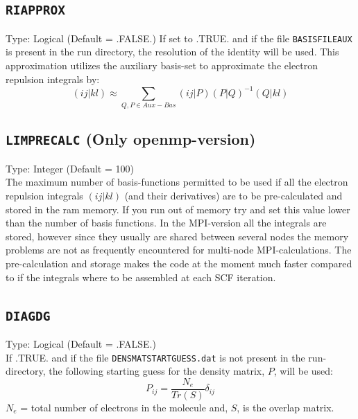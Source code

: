 \documentclass[a4paper,twoside,openany]{book}
\begin{document}
\subsection{\texttt{RIAPPROX}}
Type: Logical (Default = .FALSE.)
If set to .TRUE. and if the file \texttt{BASISFILEAUX} is present in the run directory, the resolution of the identity \cite{RI1} will be used. This approximation utilizes the auxiliary basis-set to approximate the electron repulsion integrals by:
\begin{equation}
(ij|kl) \approx \sum_{Q,P \in Aux-Bas}(ij|P)(P|Q)^{-1}(Q|kl)
\end{equation}

\subsection{\texttt{LIMPRECALC} (Only openmp-version)}
Type: Integer (Default = 100)\\
The maximum number of basis-functions permitted to be used if all the electron repulsion integrals $(ij|kl)$ (and their derivatives) are to be pre-calculated and stored in the ram memory. If you run out of memory try and set this value lower than the number of basis functions. In the MPI-version all the 
integrals are stored, however since they usually are shared between several nodes the memory problems are not as frequently encountered for multi-node
MPI-calculations. The pre-calculation and storage makes the code at the moment much faster compared to if the integrals where to be assembled  at each 
SCF iteration.

\subsection{\texttt{DIAGDG}}
Type: Logical (Default = .FALSE.) \\
If .TRUE. and if the file \texttt{DENSMATSTARTGUESS.dat} is not present in the run-directory, the following starting guess for the density matrix, $P$, will be 
used:
\begin{equation}
P_{ij} = \frac{N_{e}}{Tr(S)}\delta_{ij}
\end{equation}
$N_{e}$ = total number of electrons in the molecule and, $S$, is the overlap matrix.
\end{document}
